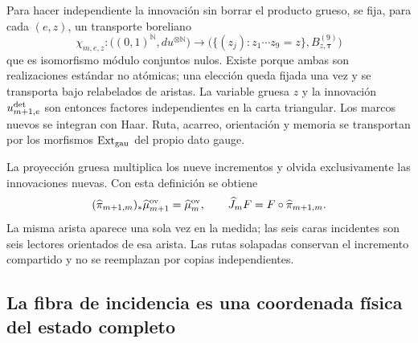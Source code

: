 Para hacer independiente la innovación sin borrar el producto grueso, se fija, para
cada $(e,z)$, un transporte boreliano
\begin{equation}\label{eq:pdf2-ym-owner-bridge-triangularization}
 \chi_{m,e,z}:\bigl((0,1)^{\mathbb N},du^{\otimes\mathbb N}\bigr)
 \longrightarrow
 \bigl(\{(z_j):z_1\cdots z_9=z\},B_{z,\boldsymbol\tau}^{(9)}\bigr)
\end{equation}
que es isomorfismo módulo conjuntos nulos. Existe porque ambas son realizaciones
estándar no atómicas; una elección queda fijada una vez y se transporta bajo
relabelados de aristas. La variable gruesa $z$ y la innovación $u^{\rm det}_{m+1,e}$
son entonces factores independientes en la carta triangular. Los marcos nuevos se
integran con Haar. Ruta, acarreo, orientación y memoria se transportan por los
morfismos $\operatorname{Ext}_{\rm gau}$ del propio dato gauge.

La proyección gruesa multiplica los nueve incrementos y olvida exclusivamente las
innovaciones nuevas. Con esta definición se obtiene
\begin{equation}\label{eq:pdf2-ym-owner-projectivity}
 (\widehat\pi_{m+1,m})_*\widehat\mu_{m+1}^{\rm ov}
 =\widehat\mu_m^{\rm ov},\qquad
 \widehat J_mF=F\circ\widehat\pi_{m+1,m}.
\end{equation}
La misma arista aparece una sola vez en la medida; las seis caras incidentes son seis
lectores orientados de esa arista. Las rutas solapadas conservan el incremento
compartido y no se reemplazan por copias independientes.

\subsection{La fibra de incidencia es una coordenada física del estado completo}

